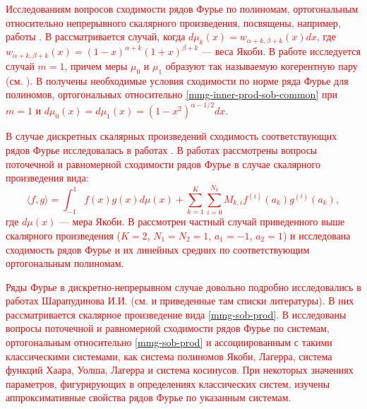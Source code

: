 \textcolor{red}{Исследованиям вопросов сходимости рядов Фурье по полиномам, ортогональным относительно непрерывного скалярного произведения, посвящены, например, работы \cite{mmg-MarcellanJacobiSobolev,mmg-CiaurriJacobiSobolev,mmg-CiaurriCoherentPairs,mmg-Fejzullahu2010,mmg-Fejzullahu2013}. В \cite{mmg-MarcellanJacobiSobolev,mmg-CiaurriJacobiSobolev} рассматривается случай, когда $d\mu_k(x)=w_{\alpha+k,\beta+k}(x)dx$, где $w_{\alpha+k,\beta+k}(x)=(1-x)^{\alpha+k}(1+x)^{\beta+k}$ --- веса Якоби. В работе \cite{mmg-CiaurriCoherentPairs} исследуется случай $m=1$, причем меры $\mu_0$ и $\mu_1$ образуют так называемую когерентную пару (см. \cite{mmg-IserlesKoch1991,mmg-MarcellanXu2015}). В \cite{mmg-Fejzullahu2010} получены необходимые условия сходимости по норме ряда Фурье для полиномов, ортогональных относительно \eqref{mmg-inner-prod-sob-common} при $m=1$ и $d\mu_0(x)=d\mu_1(x)=(1-x^2)^{\alpha-1/2}dx$.}

\textcolor{red}{В случае дискретных скалярных произведений сходимость соответствующих рядов Фурье исследовалась в работах \cite{mmg-Marcellan2002,mmg-Rocha2003,mmg-OsilenkerFourier2012,mmg-OsilenkerLinearMethods2015,mmg-Fejzullahu2009,mmg-CiaurriSigma2018}. В работах \cite{mmg-Marcellan2002,mmg-Rocha2003} рассмотрены вопросы поточечной и равномерной сходимости рядов Фурье в случае скалярного произведения вида:
\begin{equation*}
	\langle f,g \rangle = \int_{-1}^{1}f(x)g(x)d\mu(x)+
	\sum_{k=1}^K\sum_{i=0}^{N_k} M_{k,i}f^{(i)}(a_k)g^{(i)}(a_k),
\end{equation*}
где $d\mu(x)$ --- мера Якоби. В \cite{mmg-OsilenkerFourier2012,mmg-OsilenkerLinearMethods2015,mmg-Fejzullahu2009,mmg-CiaurriSigma2018} рассмотрен частный случай приведенного выше скалярного произведения ($K=2$, $N_1=N_2=1$, $a_1=-1$, $a_2=1$) и исследована сходимость рядов Фурье и их линейных средних по соответствующим ортогональным полиномам.}

\textcolor{red}{Ряды Фурье в дискретно-непрерывном случае довольно подробно исследовались в работах Шарапудинова И.И. (см. \cite{mmg-SharapudinovUMN,mmg-SharapudinovIzvRan2019} и приведенные там списки литературы). В них рассматривается скалярное произведение вида \eqref{mmg-sob-prod}.
В \cite{mmg-SharapudinovUMN,mmg-SharapudinovIzvRan2019,mmg-MMG2019,mmg-Gadzhimirzaev2019} исследованы вопросы поточечной и равномерной сходимости рядов Фурье по системам, ортогональным относительно \eqref{mmg-sob-prod} и ассоциированным с такими классическими системами, как система полиномов Якоби, Лагерра, система функций Хаара, Уолша, Лагерра и система косинусов. При некоторых значениях параметров, фигурирующих в определениях классических систем, изучены аппроксимативные свойства рядов Фурье по указанным системам.}

